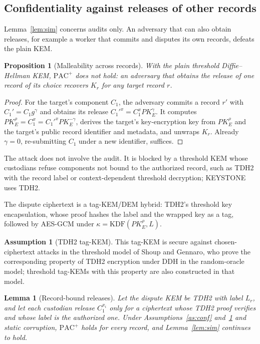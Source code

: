 \documentclass[Crown,sagev]{sagej}
\theoremstyle{plain}
\newtheorem{lemma}{Lemma}
\newtheorem{proposition}{Proposition}
\theoremstyle{definition}
\newtheorem{assumption}{Assumption}
\theoremstyle{remark}
\newcommand{\PAC}{\mathrm{PAC}}
\begin{document}
\subsection{Confidentiality against releases of other records}\label{sec:conf}

Lemma~\ref{lem:sim} concerns audits only. An adversary that can also obtain releases, for example a worker that commits and disputes its own records, defeats the plain KEM.

\begin{proposition}[Malleability across records]\label{prop:malleable}
With the plain threshold Diffie--Hellman KEM, $\PAC^{+}$ does not hold: an adversary that obtains the release of one record of its choice recovers $K_r$ for any target record $r$.
\end{proposition}

\begin{proof}
For the target's component $C_1$, the adversary commits a record $r'$ with $C_1'=C_1g^{\gamma}$ and obtains its release $C_1'^{x}=C_1^{x}PK_E^{\gamma}$. It computes $PK_E^{\rho}=C_1^{x}=C_1'^{x}PK_E^{-\gamma}$, derives the target's key-encryption key from $PK_E^{\rho}$ and the target's public record identifier and metadata, and unwraps $K_r$. Already $\gamma=0$, re-submitting $C_1$ under a new identifier, suffices.
\end{proof}

The attack does not involve the audit. It is blocked by a threshold KEM whose custodians refuse components not bound to the authorized record, such as TDH2 with the record label\cite{shoup2002securing} or context-dependent threshold decryption\cite{boneh2025context}; KEYSTONE uses TDH2.

The dispute ciphertext is a tag-KEM/DEM hybrid\cite{abe2008tagkem}: TDH2's threshold key encapsulation, whose proof hashes the label and the wrapped key as a tag, followed by AES-GCM under $\kappa=\mathrm{KDF}(PK_E^{\rho},L)$.

\begin{assumption}[TDH2 tag-KEM]\label{as:tdh2}
This tag-KEM is secure against chosen-ciphertext attacks in the threshold model of Shoup and Gennaro, who prove the corresponding property of TDH2 encryption under DDH in the random-oracle model\cite{shoup2002securing}; threshold tag-KEMs with this property are also constructed in that model\cite{ishihara2007threshold}.
\end{assumption}

\begin{lemma}[Record-bound releases]\label{lem:pacplus}
Let the dispute KEM be TDH2 with label $L_r$, and let each custodian release $C_1^{x_i}$ only for a ciphertext whose TDH2 proof verifies and whose label is the authorized one. Under Assumptions~\ref{as:conf} and~\ref{as:tdh2} and static corruption, $\PAC^{+}$ holds for every record, and Lemma~\ref{lem:sim} continues to hold.
\end{lemma}
\end{document}

